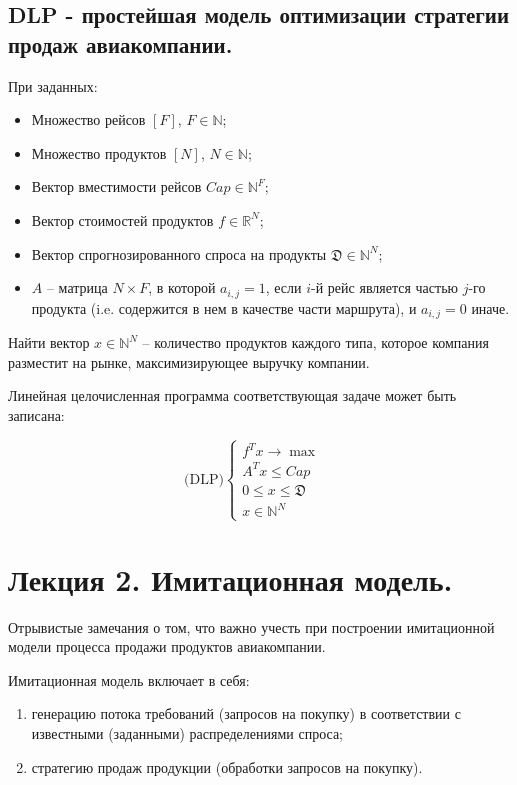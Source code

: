 \documentclass[reqno]{article}
\theoremstyle{definition}
\theoremstyle{definition}
\theoremstyle{definition}
\theoremstyle{definition}
\theoremstyle{definition}
\theoremstyle{definition}
\theoremstyle{definition}
\theoremstyle{definition}
\theoremstyle{definition}
\begin{document}
		\subsection{DLP - простейшая модель оптимизации стратегии продаж авиакомпании.}
		
		При заданных:
		\begin{itemize}
			\item Множество рейсов $[F]$, $F \in \mathds{N}$;
			\item Множество продуктов $[N]$, $N \in \mathds{N}$;
			\item Вектор вместимости рейсов $Cap \in \mathds{N}^F$;
			\item Вектор стоимостей продуктов $f \in \mathds{R}^N$;
			\item Вектор спрогнозированного спроса на продукты $\mathfrak{D} \in \mathds{N}^N$;
			\item $A$ -- матрица $N\times F$, в которой $a_{i, j} = 1$, если $i$-й рейс является частью $j$-го продукта (i.e. содержится в нем в качестве части маршрута), и $a_{i, j} = 0$ иначе.
		\end{itemize}
		
		Найти вектор $x \in \mathds{N}^N$ -- количество продуктов каждого типа, которое компания разместит на рынке, максимизирующее выручку компании.
		
		Линейная целочисленная программа соответствующая задаче может быть записана:
	
		$$
		\text{(DLP)}
		\begin{cases}
			f^Tx \rightarrow \max & \\
			A^Tx \leq Cap & \\
			0 \leq x \leq \mathfrak{D} & \\
			x \in \mathds{N}^N &
		\end{cases}	
		$$
	
	
	
	\newpage
	\section{Лекция 2. Имитационная модель.}
	
		Отрывистые замечания о том, что важно учесть при построении имитационной модели процесса продажи продуктов авиакомпании.
		
		Имитационная модель включает в себя:
		\begin{enumerate}
			\item генерацию потока требований (запросов на покупку) в соответствии с известными (заданными) распределениями спроса;
			\item стратегию продаж продукции (обработки запросов на покупку).
		\end{enumerate}
		
\end{document}
